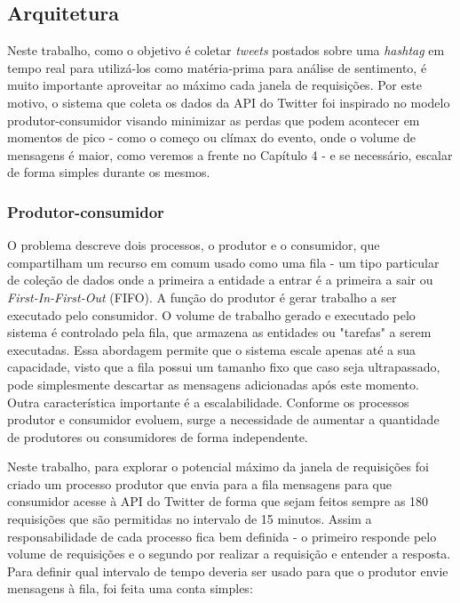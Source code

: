 \subsection{Arquitetura}

Neste trabalho, como o objetivo é coletar \textit{tweets} postados sobre uma \textit{hashtag} em tempo real para utilizá-los como matéria-prima para análise de sentimento, é muito importante aproveitar ao máximo cada janela de requisições. Por este motivo, o sistema que coleta os dados da API do Twitter foi inspirado no modelo produtor-consumidor\cite{jeffay1993real} visando minimizar as perdas que podem acontecer em momentos de pico - como o começo ou clímax do evento, onde o volume de mensagens é maior, como veremos a frente no Capítulo 4 - e se necessário, escalar de forma simples durante os mesmos. 

\subsubsection{Produtor-consumidor}

O problema descreve dois processos, o produtor e o consumidor, que compartilham um recurso em comum usado como uma fila - um tipo particular de coleção de dados onde a primeira a entidade a entrar é a primeira a sair ou \textit{First-In-First-Out} (FIFO). A função do produtor é gerar trabalho a ser executado pelo consumidor. O volume de trabalho gerado e executado pelo sistema é controlado pela fila, que armazena as entidades ou "tarefas" a serem executadas. Essa abordagem permite que o sistema escale apenas até a sua capacidade, visto que a fila possui um tamanho fixo que caso seja ultrapassado, pode simplesmente descartar as mensagens adicionadas após este momento. Outra característica importante é a escalabilidade. Conforme os processos produtor e consumidor evoluem, surge a necessidade de aumentar a quantidade de produtores ou consumidores de forma independente.

Neste trabalho, para explorar o potencial máximo da janela de requisições foi criado um processo produtor que envia para a fila mensagens para que consumidor acesse à API do Twitter de forma que sejam feitos sempre as 180 requisições que são permitidas no intervalo de 15 minutos. Assim a responsabilidade de cada processo fica bem definida - o primeiro responde pelo volume de requisições e o segundo por realizar a requisição e entender a resposta. Para definir qual intervalo de tempo deveria ser usado para que o produtor envie mensagens à fila, foi feita uma conta simples:

